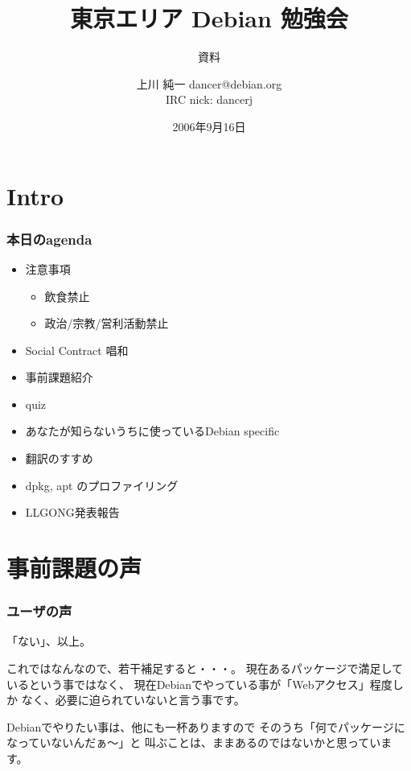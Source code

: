 \documentclass[cjk,dvipdfmx]{beamer}
\title{東京エリア Debian 勉強会}
\subtitle{資料}
\author{上川 純一 dancer@debian.org\\IRC nick: dancerj}
\date{2006年9月16日}
\begin{document}
\frame{\titlepage{}}

\section{Intro}
\begin{frame}
 \frametitle{本日のagenda}
\begin{itemize}
 \item 注意事項
       \begin{itemize}
	\item 飲食禁止
	\item 政治/宗教/営利活動禁止
       \end{itemize}
 \item Social Contract 唱和
 \item 事前課題紹介
 \item quiz
 \item あなたが知らないうちに使っているDebian specific
 \item 翻訳のすすめ
 \item dpkg, apt のプロファイリング
 \item LLGONG発表報告
\end{itemize}
\end{frame}

\section{事前課題の声}

\begin{frame}
 \frametitle{ユーザの声}
    「ない」、以上。

    これではなんなので、若干補足すると・・・。
現在あるパッケージで満足しているという事ではなく、
現在Debianでやっている事が「Webアクセス」程度しか
なく、必要に迫られていないと言う事です。

    Debianでやりたい事は、他にも一杯ありますので
そのうち「何でパッケージになっていないんだぁ〜」と
叫ぶことは、ままあるのではないかと思っています。
\end{frame}

\end{document}
